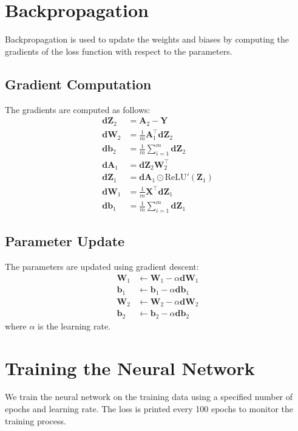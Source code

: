 \documentclass{article}
\begin{document}
\section{Backpropagation}
Backpropagation is used to update the weights and biases by computing the gradients of the loss function with respect to the parameters.

\subsection{Gradient Computation}
The gradients are computed as follows:
\begin{align}
\mathbf{dZ}_2 &= \mathbf{A}_2 - \mathbf{Y} \\
\mathbf{dW}_2 &= \frac{1}{m} \mathbf{A}_1^\top \mathbf{dZ}_2 \\
\mathbf{db}_2 &= \frac{1}{m} \sum_{i=1}^m \mathbf{dZ}_2 \\
\mathbf{dA}_1 &= \mathbf{dZ}_2 \mathbf{W}_2^\top \\
\mathbf{dZ}_1 &= \mathbf{dA}_1 \odot \text{ReLU}'(\mathbf{Z}_1) \\
\mathbf{dW}_1 &= \frac{1}{m} \mathbf{X}^\top \mathbf{dZ}_1 \\
\mathbf{db}_1 &= \frac{1}{m} \sum_{i=1}^m \mathbf{dZ}_1
\end{align}

\subsection{Parameter Update}
The parameters are updated using gradient descent:
\begin{align}
\mathbf{W}_1 &\leftarrow \mathbf{W}_1 - \alpha \mathbf{dW}_1 \\
\mathbf{b}_1 &\leftarrow \mathbf{b}_1 - \alpha \mathbf{db}_1 \\
\mathbf{W}_2 &\leftarrow \mathbf{W}_2 - \alpha \mathbf{dW}_2 \\
\mathbf{b}_2 &\leftarrow \mathbf{b}_2 - \alpha \mathbf{db}_2
\end{align}
where \( \alpha \) is the learning rate.

\section{Training the Neural Network}
We train the neural network on the training data using a specified number of epochs and learning rate. The loss is printed every 100 epochs to monitor the training process.
\end{document}
